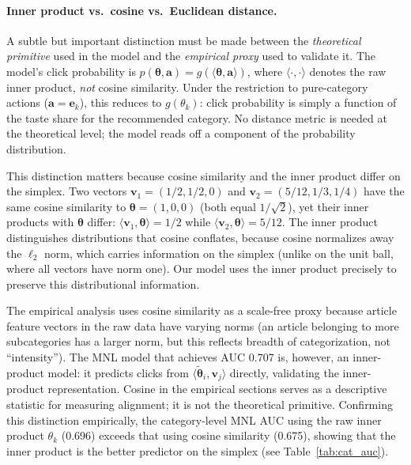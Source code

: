 \documentclass[11pt]{article}
\begin{document}
\paragraph{Inner product vs.\ cosine vs.\ Euclidean distance.} A subtle but important distinction must be made between the \emph{theoretical primitive} used in the model and the \emph{empirical proxy} used to validate it. The model's click probability is $p(\boldsymbol{\theta}, \mathbf{a}) = g(\langle \boldsymbol{\theta}, \mathbf{a} \rangle)$, where $\langle \cdot, \cdot \rangle$ denotes the raw inner product, \emph{not} cosine similarity. Under the restriction to pure-category actions ($\mathbf{a} = \mathbf{e}_k$), this reduces to $g(\theta_k)$: click probability is simply a function of the taste share for the recommended category. No distance metric is needed at the theoretical level; the model reads off a component of the probability distribution.

This distinction matters because cosine similarity and the inner product differ on the simplex. Two vectors $\mathbf{v}_1 = (1/2, 1/2, 0)$ and $\mathbf{v}_2 = (5/12, 1/3, 1/4)$ have the same cosine similarity to $\boldsymbol{\theta} = (1, 0, 0)$ (both equal $1/\sqrt{2}$), yet their inner products with $\boldsymbol{\theta}$ differ: $\langle \mathbf{v}_1, \boldsymbol{\theta} \rangle = 1/2$ while $\langle \mathbf{v}_2, \boldsymbol{\theta} \rangle = 5/12$. The inner product distinguishes distributions that cosine conflates, because cosine normalizes away the $\ell_2$ norm, which carries information on the simplex (unlike on the unit ball, where all vectors have norm one). Our model uses the inner product precisely to preserve this distributional information.

The empirical analysis uses cosine similarity as a scale-free proxy because article feature vectors in the raw data have varying norms (an article belonging to more subcategories has a larger norm, but this reflects breadth of categorization, not ``intensity''). The MNL model that achieves AUC 0.707 is, however, an inner-product model: it predicts clicks from $\langle \tilde{\boldsymbol{\theta}}_i, \mathbf{v}_j \rangle$ directly, validating the inner-product representation. Cosine in the empirical sections serves as a descriptive statistic for measuring alignment; it is not the theoretical primitive. Confirming this distinction empirically, the category-level MNL AUC using the raw inner product $\theta_k$ (0.696) exceeds that using cosine similarity (0.675), showing that the inner product is the better predictor on the simplex (see Table~\ref{tab:cat_auc}).
\end{document}

